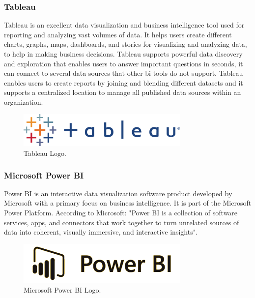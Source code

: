 \subsubsection{Tableau}
\label{sec:tableau}
Tableau is an excellent data visualization and business intelligence tool used for reporting and analyzing vast volumes of data. It helps users create different charts, graphs, maps, dashboards, and stories for visualizing and analyzing data, to help in making business decisions. Tableau supports powerful data discovery and exploration that enables users to answer important questions in seconds, it can connect to several data sources that other \gls{bi} tools do not support. Tableau enables users to create reports by joining and blending different datasets and it supports a centralized location to manage all published data sources within an organization\cite{WhatTableauUltimate}.
\begin{figure}[h!]
    \center
    \includegraphics[width=0.75\textwidth]{images/chapter4/TableauLogo.png}
    \caption{Tableau Logo.}
    \label{fig:tableau}
\end{figure}

\subsubsection{Microsoft Power BI}
Power BI is an interactive data visualization software product developed by Microsoft with a primary focus on business intelligence. It is part of the Microsoft Power Platform. According to Microsoft: "Power BI is a collection of software services, apps, and connectors that work together to turn unrelated sources of data into coherent, visually immersive, and interactive insights"\cite{DataVisualisationMicrosoft}.
\begin{figure}[h!]
    \center
    \includegraphics[width=0.75\textwidth]{images/chapter4/powerBi.png}
    \caption{Microsoft Power BI Logo.}
    \label{fig:powerBi}
\end{figure}
\newpage
